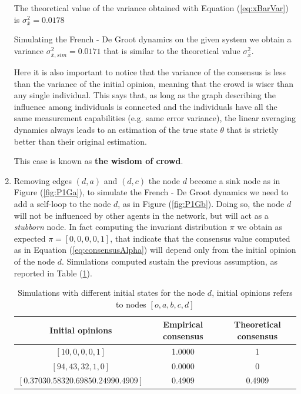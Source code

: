 \documentclass[
	12pt, %
]{fphw}
\begin{document}
\begin{enumerate}[(a\normalfont)]
    The theoretical value of the variance obtained with Equation (\ref{eq:xBarVar}) is $\sigma^{2}_{\overline{x}} = 0.0178$
    
    Simulating the French - De Groot dynamics on the given system we obtain a variance $\sigma^{2}_{\overline{x},sim} = 0.0171$ that is similar to the theoretical value $\sigma^{2}_{\overline{x}}$.
    
    Here it is also important to notice that the variance of the consensus is less than the variance of the initial opinion, meaning that the crowd is wiser than any single individual. This says that, as long as the graph describing the influence among individuals is connected and the individuals have all the same measurement capabilities (e.g. same error variance), the linear averaging dynamics always leads to an estimation of the true state $\theta$ that is strictly better than their original estimation.
    
    This case is known as \textbf{the wisdom of crowd}.
    
    \item Removing edges $(d,a)$ and $(d,c)$ the node $d$ become a sink node as in Figure (\ref{fig:P1Ga}), to simulate the French - De Groot dynamics we need to add a self-loop to the node $d$, as in Figure (\ref{fig:P1Gb}). Doing so, the node $d$ will not be influenced by other agents in the network, but will act as a \emph{stubborn} node. 
    In fact computing the invariant distribution $\pi$ we obtain as expected $\pi = [0, 0, 0, 0, 1]$, that indicate that the consensus value computed as in Equation (\ref{eq:consensusAlpha}) will depend only from the initial opinion of the node $d$. 
    Simulations computed sustain the previous assumption, as reported in Table (\ref{tab:P1ConsensusG}).
    
    \begin{table}[H]
      \begin{center}
        \begin{tabular}{c|c|c} 
          \textbf{Initial opinions} & \textbf{Empirical consensus} & \textbf{Theoretical consensus}\\
          \hline
          $ [10, 0, 0, 0, 1] $ & 1.0000 & 1\\
          $ [94, 43, 32, 1, 0] $ & 0.0000 & 0 \\
          $ [0.3703 0.5832 0.6985 0.2499 0.4909] $ & 0.4909 & 0.4909 
        \end{tabular}
      \end{center}
      \caption{Simulations with different initial states for the node $d$, initial opinions refers to nodes $[o, a, b, c, d]$}
      \label{tab:P1ConsensusG}
    \end{table}
    

\end{enumerate}
\end{document}
